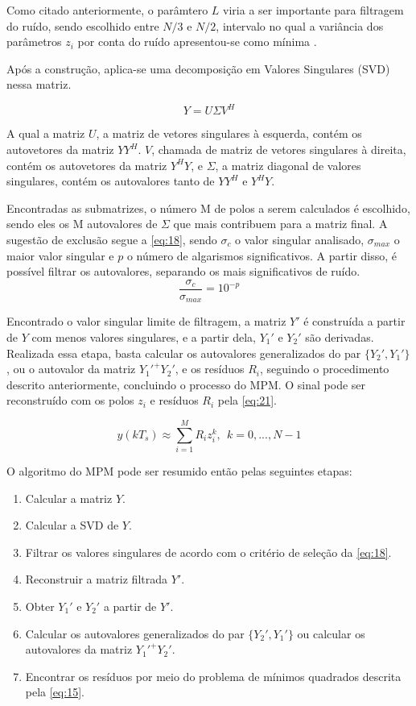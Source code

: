 \documentclass[12pt]{article}
\begin{document}
Como citado anteriormente, o parâmtero $L$ viria a ser importante para filtragem do ruído, sendo escolhido entre $N/3$ e $N/2$, intervalo no qual 
a variância dos parâmetros $z_i$ por conta do ruído apresentou-se como mínima \cite{370583}.

Após a construção, aplica-se uma decomposição em Valores Singulares (SVD) nessa matriz. 

\begin{equation} \label{eq:17}
    Y = U \Sigma V^H
\end{equation}

A qual a matriz $U$, a matriz de vetores singulares à esquerda, contém os autovetores da matriz $YY^H$. $V$, chamada de matriz de vetores singulares 
à direita, contém os autovetores da matriz $Y^HY$, e $\Sigma$, a matriz diagonal de valores singulares, contém os autovalores tanto de $YY^H$ e $Y^HY$.

Encontradas as submatrizes, o número M de polos a serem calculados é escolhido, sendo eles os M autovalores de $\Sigma$ que mais contribuem para a matriz final. 
A sugestão de exclusão segue a \autoref{eq:18}, sendo $\sigma_c$ o valor singular analisado, $\sigma _{max}$ o maior valor singular e $p$ o número de algarismos significativos. 
A partir disso, é possível filtrar os autovalores, separando os mais significativos de ruído.
\begin{equation} \label{eq:18}
    \frac{\sigma_c}{\sigma _{max}} = 10^{-p}
\end{equation}

Encontrado o valor singular limite de filtragem, a matriz $Y'$ é construída a partir de $Y$ com menos valores singulares, e a partir dela, $Y_1'$ e $Y_2'$ são derivadas. Realizada essa etapa, 
basta calcular os autovalores generalizados do par $\{Y_2', Y_1'\}$, ou o autovalor da matriz $Y_1'^+Y_2'$, e os resíduos $R_i$, seguindo o procedimento descrito anteriormente,
concluindo o processo do MPM. O sinal pode ser reconstruído com os polos $z_i$ e resíduos $R_i$ pela \autoref{eq:21}.

\begin{equation} \label{eq:21}
    y(kT_s) \approx \sum_{i = 1}^{M}R_i z_i^{k}, \ \ k = 0,...,N-1
\end{equation}

O algoritmo do MPM pode ser resumido então pelas seguintes etapas:

\begin{enumerate} \label{en:1}
    \item Calcular a matriz $Y$.
    \item Calcular a SVD de $Y$.
    \item Filtrar os valores singulares de acordo com o critério de seleção da \autoref{eq:18}.
    \item Reconstruir a matriz filtrada $Y'$.
    \item Obter $Y_1'$ e $Y_2'$ a partir de $Y'$.
    \item Calcular os autovalores generalizados do par $\{Y_2', Y_1'\}$ ou calcular os autovalores da matriz $Y_1'^+Y_2'$.
    \item Encontrar os resíduos por meio do problema de mínimos quadrados descrita pela \autoref{eq:15}.
\end{enumerate}
\end{document}
